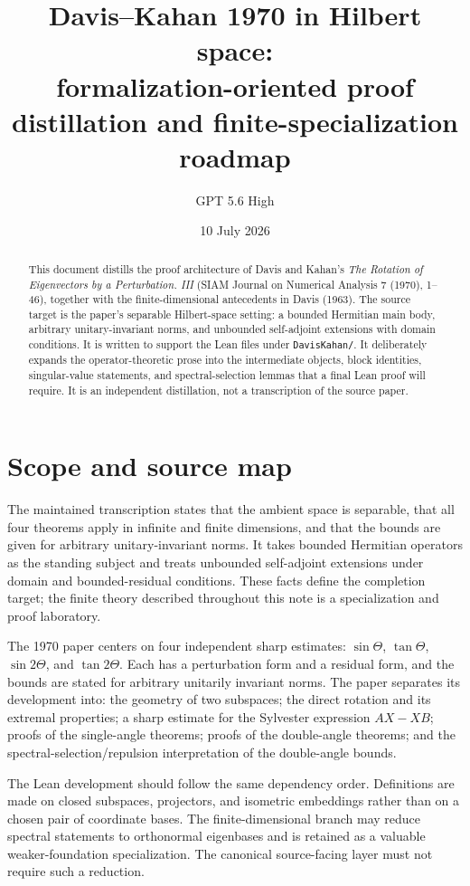\documentclass[11pt]{article}
\title{Davis--Kahan 1970 in Hilbert space:\\
formalization-oriented proof distillation and finite-specialization roadmap}
\author{GPT 5.6 High}
\date{10 July 2026}
\theoremstyle{remark}
\begin{document}
\maketitle

\begin{abstract}
This document distills the proof architecture of Davis and Kahan's
\emph{The Rotation of Eigenvectors by a Perturbation. III} (SIAM Journal on
Numerical Analysis 7 (1970), 1--46), together with the finite-dimensional
antecedents in Davis (1963). The source target is the paper's separable
Hilbert-space setting: a bounded Hermitian main body, arbitrary
unitary-invariant norms, and unbounded self-adjoint extensions with domain
conditions. It is written to support the Lean files under
\texttt{DavisKahan/}.
It deliberately expands the operator-theoretic prose into the intermediate
objects, block identities, singular-value statements, and spectral-selection
lemmas that a final Lean proof will require.  It is an independent distillation,
not a transcription of the source paper.
\end{abstract}

\tableofcontents

\section{Scope and source map}

The maintained transcription states that the ambient space is separable,
that all four theorems apply in infinite and finite dimensions, and that the
bounds are given for arbitrary unitary-invariant norms. It takes bounded
Hermitian operators as the standing subject and treats unbounded self-adjoint
extensions under domain and bounded-residual conditions. These facts define
the completion target; the finite theory described throughout this note is a
specialization and proof laboratory.

The 1970 paper centers on four independent sharp estimates:
\(\sin\Theta\), \(\tan\Theta\), \(\sin 2\Theta\), and
\(\tan 2\Theta\).  Each has a perturbation form and a residual form, and the
bounds are stated for arbitrary unitarily invariant norms.  The paper separates
its development into: the geometry of two subspaces; the direct rotation and
its extremal properties; a sharp estimate for the Sylvester expression
\(AX-XB\); proofs of the single-angle theorems; proofs of the double-angle
theorems; and the spectral-selection/repulsion interpretation of the
double-angle bounds.

The Lean development should follow the same dependency order. Definitions are
made on closed subspaces, projectors, and isometric embeddings rather than on a
chosen pair of coordinate bases. The finite-dimensional branch may reduce
spectral statements to orthonormal eigenbases and is retained as a valuable
weaker-foundation specialization. The canonical source-facing layer must not
require such a reduction.
\end{document}
